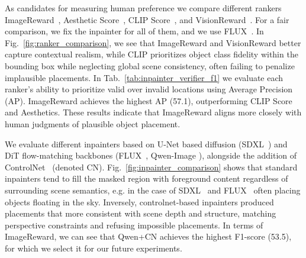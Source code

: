  As candidates for measuring human preference we compare different rankers ImageReward~\cite{xu2023imagereward}, Aesthetic Score~\cite{aestheticpredictor2024}, CLIP Score~\cite{hessel2021clipscore}, and VisionReward~\cite{xu2025visionrewardfinegrainedmultidimensionalhuman}. For a fair comparison, we fix the inpainter for all of them, and we use FLUX~\cite{batifol2025flux}.
In Fig.~\ref{fig:ranker_comparison}, we see that ImageReward and VisionReward better capture contextual realism, while CLIP prioritizes object class fidelity within the bounding box while neglecting global scene consistency, often failing to penalize implausible placements. In Tab.~\ref{tab:inpainter_verifier_f1} we evaluate each ranker’s ability to prioritize valid over invalid locations using Average Precision (AP). ImageReward achieves the highest AP (57.1), outperforming CLIP Score and Aesthetics. These results indicate that ImageReward aligns more closely with human judgments of plausible object placement. 

 We evaluate different inpainters based on U-Net based diffusion (SDXL~\cite{podell2023sdxl}) and DiT flow-matching backbones (FLUX~\cite{batifol2025flux}, Qwen-Image \cite{wu2025qwen}), alongside the addition of ControlNet~\cite{zhang2023adding} (denoted CN). 
Fig.~\ref{fig:inpainter_comparison} shows that standard inpainters tend to fill the masked region with foreground content regardless of surrounding scene semantics, e.g. in the case of SDXL~\cite{podell2023sdxl} and FLUX~\cite{batifol2025flux} often placing objects floating in the sky. Inversely, controlnet-based inpainters produced placements that more consistent with scene depth and structure, matching perspective constraints and refusing impossible placements. In terms of ImageReward, we can see that Qwen+CN achieves the highest F1-score (53.5), for which we select it for our future experiments.





